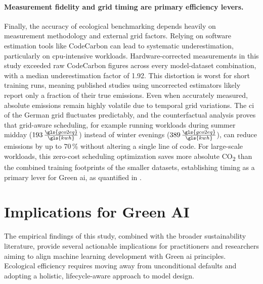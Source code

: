 \paragraph{Measurement fidelity and grid timing are primary efficiency levers.}
Finally, the accuracy of ecological benchmarking depends heavily on measurement methodology and external grid factors. Relying on software estimation tools like CodeCarbon can lead to systematic underestimation, particularly on \gls{cpu}-intensive workloads. Hardware-corrected measurements in this study exceeded raw CodeCarbon figures across every model-dataset combination, with a median underestimation factor of 1.92. This distortion is worst for short training runs, meaning published studies using uncorrected estimators likely report only a fraction of their true emissions. Even when accurately measured, absolute emissions remain highly volatile due to temporal grid variations. The \gls{ci} of the German grid fluctuates predictably, and the counterfactual analysis proves that grid-aware scheduling, for example running workloads during summer midday ($193\,\frac{\gls{gco2eq}}{\gls{kwh}}$) instead of winter evenings ($389\,\frac{\gls{gco2eq}}{\gls{kwh}}$), can reduce emissions by up to 70\,\% without altering a single line of code. For large-scale workloads, this zero-cost scheduling optimization saves more absolute CO\textsubscript{2} than the combined training footprints of the smaller datasets, establishing timing as a primary lever for Green \gls{ai}, as quantified in .


\section{Implications for Green AI}
\label{sec:implications}

The empirical findings of this study, combined with the broader sustainability literature, provide several actionable implications for practitioners and researchers aiming to align machine learning development with Green \gls{ai} principles. Ecological efficiency requires moving away from unconditional defaults and adopting a holistic, lifecycle-aware approach to model design.

